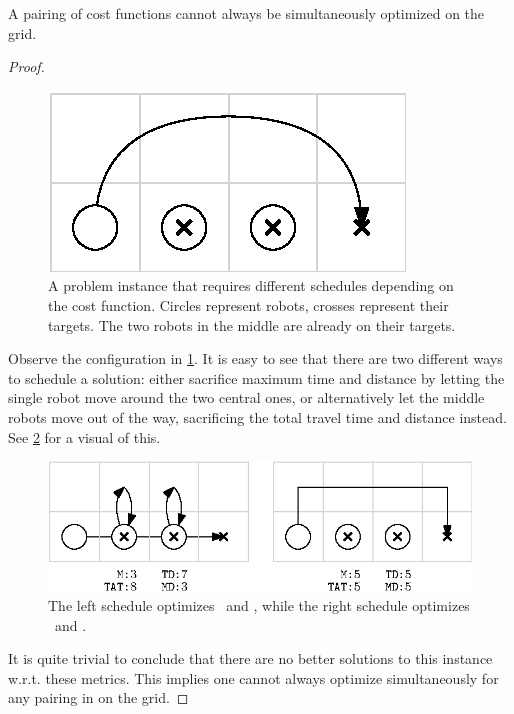 \begin{lemma}\label{lemma:simultaneous_1}
	A pairing of cost functions  cannot always be simultaneously optimized on the grid.
\end{lemma}

\begin{proof}

	\begin{figure}[h]
		\centering
		\includegraphics[width=0.35\linewidth]{ipe/sim1_problem.eps}
		\caption{
			A problem instance that requires different schedules depending on the cost function. Circles represent robots, crosses represent their targets. The two robots in the middle are already on their targets. 
		}
		\label{fig:sim1}
	\end{figure}

	Observe the configuration in \cref{fig:sim1}. 
	It is easy to see that there are two different ways to schedule a solution: either sacrifice maximum time and distance by letting the single robot move around the two central ones, or alternatively let the middle robots move out of the way, sacrificing the total travel time and distance instead. 
	See \cref{fig:sim1_strat} for a visual of this. 

	\begin{figure}[h]
		\centering
		\includegraphics[width=0.7\linewidth]{ipe/sim1_strat.eps}
		\caption{
			The left schedule optimizes \ and , while the right schedule optimizes \ and .
		}
		\label{fig:sim1_strat}
	\end{figure}

It is quite trivial to conclude that there are no better solutions to this instance w.r.t. these metrics. 
This implies one cannot always optimize simultaneously for any pairing in  on the grid.
\end{proof}

